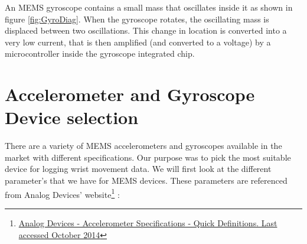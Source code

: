 An MEMS gyroscope contains a small mass that oscillates inside it as shown in figure \ref{fig:GyroDiag}. When the gyroscope rotates, the oscillating mass is displaced between two oscillations. This change in location is converted into a very low current, that is then amplified (and converted to a voltage) by a microcontroller inside the gyroscope integrated chip.

\section{Accelerometer and Gyroscope Device selection}
There are a variety of MEMS accelerometers and gyroscopes available in the market with different specifications. Our purpose was to pick the most suitable device for logging wrist movement data. We will first look at the different parameter's that we have for MEMS devices. These parameters are referenced from Analog Devices' website\footnote{\href{http://www.analog.com/en/content/td_accelerometer_specifications_definitions/fca.html}{Analog Devices - Accelerometer Specifications - Quick Definitions. Last accessed October 2014}} :

